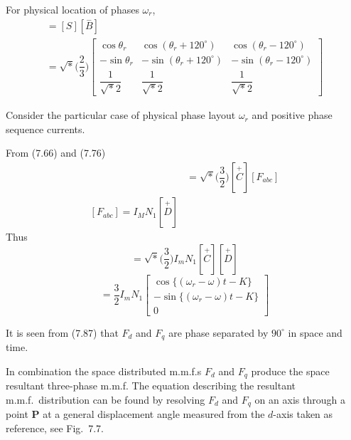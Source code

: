 \documentclass[a4paper,numbers=noenddot,12pt]{scrbook}
\begin{document}
    For physical location of phases $\omega_r$,  %
    \begin{multline}
        [\overset{-}{C}] = [S] [\overset{-}{B}] \\
        = \sqrt*{\Big( \dfrac{2}{3} \Big)}
        \begin{bmatrix}
            \cos \theta_r & \cos (\theta_r + 120^{\circ}) & \cos (\theta_r - 120^{\circ}) \\
            - \sin \theta_r & - \sin (\theta_r + 120^{\circ}) & - \sin (\theta_r - 120^{\circ}) \\
            \dfrac{1}{\sqrt*{2}} & \dfrac{1}{\sqrt*{2}} & \dfrac{1}{\sqrt*{2}}
        \end{bmatrix}
        \label{eq:Eq7.83}
    \end{multline}

    Consider the particular  case of physical phase layout $\omega_r$ and positive phase sequence currents. %

    From (7.66) and  (7.76)
    \begin{align}
        [F_{d q \gamma}] &=  \sqrt*{\Big( \dfrac{3}{2} \Big)} [\overset{+}{C}] [F_{abc}] \\
        [F_{abc}] = I_M N_1 [\overset{+}{D}]
        \label{eq:Eq7.85}
    \end{align}
    Thus
    \begin{equation}
        [F_{d q \gamma}] =  \sqrt*{\Big( \dfrac{3}{2} \Big)} I_m N_1 [\overset{+}{C}] [\overset{+}{D}]
        \label{eq:Eq7.86}
    \end{equation}
    \begin{equation}
        [F_{d q \gamma}] = \dfrac{3}{2} I_m N_1
        \begin{bmatrix}
            \cos \{(\omega_r -\omega)t - K\} \\
            -\sin \{(\omega_r -\omega)t - K\} \\
            0
        \end{bmatrix}
        \label{eq:Eq7.87}
    \end{equation}

    It is seen from (7.87) that $F_d$ and $F_q$ are phase separated by $90^{\circ}$ in space and time.

    In combination the space distributed m.m.f.s $F_d$ and $F_q$ produce the space resultant three-phase m.m.f. The equation describing the resultant m.m.f.\ distribution can be found by resolving $F_d$ and $F_q$ on an axis through a point \textbf{P} at a general displacement angle measured from the $d$-axis taken as reference, see Fig.\ 7.7.
\end{document}
